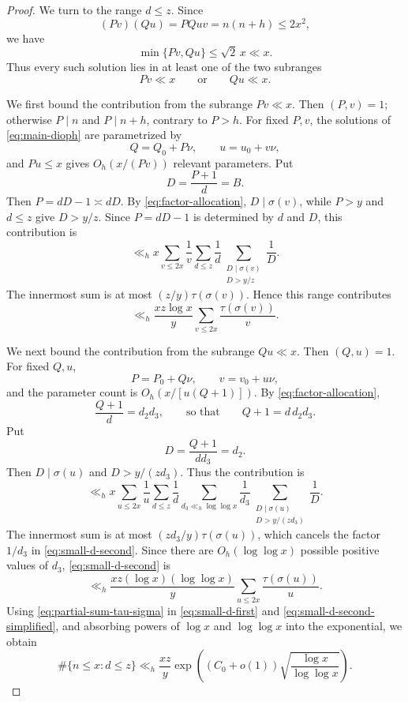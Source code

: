 \documentclass[11pt,reqno]{amsart}
\numberwithin{equation}{section}
\theoremstyle{plain}
\theoremstyle{definition}
\theoremstyle{remark}
\begin{document}
\begin{proof}
We turn to the range $d\le z$. Since
\[
(Pv)(Qu)=PQuv=n(n+h)\le2x^2,
\]
we have
\[
\min\{Pv,Qu\}\le\sqrt2\,x\ll x.
\]
Thus every such solution lies in at least one of the two subranges
\[
Pv\ll x
\qquad\text{or}\qquad
Qu\ll x.
\]

We first bound the contribution from the subrange $Pv\ll x$. Then $(P,v)=1$; otherwise $P\mid n$ and $P\mid n+h$, contrary to $P>h$. For fixed $P,v$, the solutions of \eqref{eq:main-dioph} are parametrized by
\[
Q=Q_0+P\nu,\qquad u=u_0+v\nu,
\]
and $Pu\le x$ gives $O_h(x/(Pv))$ relevant parameters. Put
\[
D=\frac{P+1}{d}=B.
\]
Then $P=dD-1\asymp dD$. By \eqref{eq:factor-allocation},
$D\mid\sigma(v)$, while $P>y$ and $d\le z$ give $D>y/z$. Since $P=dD-1$ is determined by $d$ and $D$, this contribution is
\[
\ll_h
x\sum_{v\le2x}\frac1v
\sum_{d\le z}\frac1d
\sum_{\substack{D\mid\sigma(v)\\D>y/z}}\frac1D.
\]
The innermost sum is at most $(z/y)\tau(\sigma(v))$. Hence this range contributes
\begin{equation}\label{eq:small-d-first}
\ll_h
\frac{xz\log x}{y}
\sum_{v\le2x}\frac{\tau(\sigma(v))}{v}.
\end{equation}

We next bound the contribution from the subrange $Qu\ll x$. Then $(Q,u)=1$. For fixed $Q,u$,
\[
P=P_0+Q\nu,\qquad v=v_0+u\nu,
\]
and the parameter count is $O_h(x/[u(Q+1)])$. By \eqref{eq:factor-allocation},
\[
\frac{Q+1}{d}=d_2d_3,
\qquad\text{so that}\qquad
Q+1=d\,d_2d_3.
\]
Put
\[
D=\frac{Q+1}{dd_3}=d_2.
\]
Then $D\mid\sigma(u)$ and $D>y/(zd_3)$. Thus the contribution is
\begin{equation}\label{eq:small-d-second}
\ll_h
x\sum_{u\le2x}\frac1u
\sum_{d\le z}\frac1d
\sum_{d_3\ll_h\log\log x}\frac1{d_3}
\sum_{\substack{D\mid\sigma(u)\\D>y/(zd_3)}}\frac1D.
\end{equation}
The innermost sum is at most $(zd_3/y)\tau(\sigma(u))$, which cancels the factor $1/d_3$ in \eqref{eq:small-d-second}. Since there are $O_h(\log\log x)$ possible positive values of $d_3$, \eqref{eq:small-d-second} is
\begin{equation}\label{eq:small-d-second-simplified}
\ll_h
\frac{xz(\log x)(\log\log x)}{y}
\sum_{u\le2x}\frac{\tau(\sigma(u))}{u}.
\end{equation}
Using \eqref{eq:partial-sum-tau-sigma} in \eqref{eq:small-d-first} and \eqref{eq:small-d-second-simplified}, and absorbing powers of $\log x$ and $\log\log x$ into the exponential, we obtain
\begin{equation}\label{eq:small-d-total}
\#\{n\le x:d\le z\}
\ll_h
\frac{xz}{y}
\exp\!\left((C_0+o(1))\sqrt{\frac{\log x}{\log\log x}}\right).
\end{equation}


\end{proof}
\end{document}
